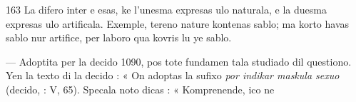 \begin{VUpage}[167]{163}
La difero inter  e  esas, ke l'unesma expresas ulo\nl
naturala, e la duesma expresas ulo artificala. Exemple,\nl
tereno  nature kontenas sablo; ma korto \nl
havas sablo nur artifice, per laboro qua kovris lu ye sablo.\parplein

 --- Adoptita per la decido 1090, pos tote fundamen\cc
tala studiado dil questiono. Yen la texto di la decido : « On\nl
adoptas la sufixo  \textit{por indikar maskula sexuo} (decido, : V, 65). Specala noto dicas : « Komprenende, ico ne\parplein
\end{VUpage}

